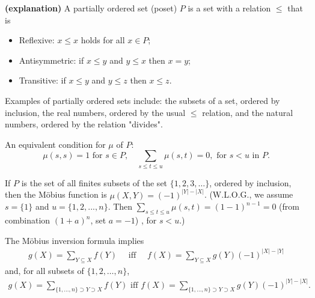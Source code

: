 \documentclass{article}
\newcommand{\bfs}[1]{\textbf{({#1}) }}
\begin{document}
\begin{rema}\bfs{explanation}
A partially ordered set (poset) $P$ is a set with a relation $\leq$ that is
\begin{itemize}
    \item Reflexive: $x \leq x$ holds for all $x \in P$;
    \item Antisymmetric: if $x \leq y$ and $y \leq x$ then $x=y$;
    \item Transitive: if $x \leq y$ and $y \leq z$ then $x \leq z$.
\end{itemize}
Examples of partially ordered sets include: the subsets of a set, ordered by inclusion, the real numbers, ordered by the usual $\leq$ relation, and the natural numbers, ordered by the relation "divides".

An equivalent condition for  $\mu$ of $P$:
$$\mu(s, s)=1 \text{  for  } s \in P, \quad \sum_{s \leq t\le u} \mu(s, t)=0, \text{ for }s<u \text{ in }P .$$

If $P$ is the set of all finites subsets of the set $\{1,2,3, \ldots\}$, ordered by inclusion, then the M\"obius function is $\mu(X, Y)=(-1)^{|Y|-|X|}$. (W.L.O.G., we assume $s=\{1\}$ and $u=\{1,2,...,n\}$. Then $\sum_{s \leq t\le u} \mu(s, t)=(1-1)^{n-1}=0$ (from combination $(1+a)^n$, set $a=-1$) , for $s<u$.)

The M\"obius inversion formula implies
\begin{align*}
g(X)=\sum_{Y \subseteq X} f(Y) \quad \text { iff } \quad f(X)=\sum_{Y \subseteq X} g(Y)(-1)^{|X|-|Y|}
\end{align*}
and, for all subsets of $\{1,2, \ldots, n\}$,
\begin{align*}
g(X)=\sum_{\{1, \ldots, n\} \supset Y \supset X} f(Y) \text { iff } f(X)=\sum_{\{1, \ldots, n\} \supset Y \supset X} g(Y)(-1)^{|Y|-|X|} .
\end{align*}
\end{rema}
\end{document}
